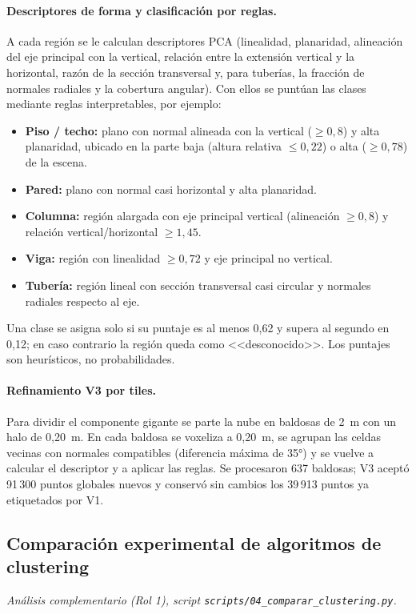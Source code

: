 \documentclass[11pt,a4paper]{article}
\begin{document}
\paragraph{Descriptores de forma y clasificación por reglas.} A cada región se le calculan descriptores PCA (linealidad, planaridad, alineación del eje principal con la vertical, relación entre la extensión vertical y la horizontal, razón de la sección transversal y, para tuberías, la fracción de normales radiales y la cobertura angular). Con ellos se puntúan las clases mediante reglas interpretables, por ejemplo:
\begin{itemize}
\item \textbf{Piso / techo:} plano con normal alineada con la vertical ($\ge0{,}8$) y alta planaridad, ubicado en la parte baja (altura relativa $\le0{,}22$) o alta ($\ge0{,}78$) de la escena.
\item \textbf{Pared:} plano con normal casi horizontal y alta planaridad.
\item \textbf{Columna:} región alargada con eje principal vertical (alineación $\ge0{,}8$) y relación vertical/horizontal $\ge1{,}45$.
\item \textbf{Viga:} región con linealidad $\ge0{,}72$ y eje principal no vertical.
\item \textbf{Tubería:} región lineal con sección transversal casi circular y normales radiales respecto al eje.
\end{itemize}
Una clase se asigna solo si su puntaje es al menos 0,62 y supera al segundo en 0,12; en caso contrario la región queda como <<desconocido>>. Los puntajes son heurísticos, no probabilidades.

\paragraph{Refinamiento V3 por tiles.} Para dividir el componente gigante se parte la nube en baldosas de 2~m con un halo de 0,20~m. En cada baldosa se voxeliza a 0,20~m, se agrupan las celdas vecinas con normales compatibles (diferencia máxima de 35°) y se vuelve a calcular el descriptor y a aplicar las reglas. Se procesaron 637 baldosas; V3 aceptó 91\,300 puntos globales nuevos y conservó sin cambios los 39\,913 puntos ya etiquetados por V1.

\subsection{Comparación experimental de algoritmos de clustering}
\label{sec:comparacion}
\textit{Análisis complementario (Rol 1), script \texttt{scripts/04\_comparar\_clustering.py}.}
\end{document}
